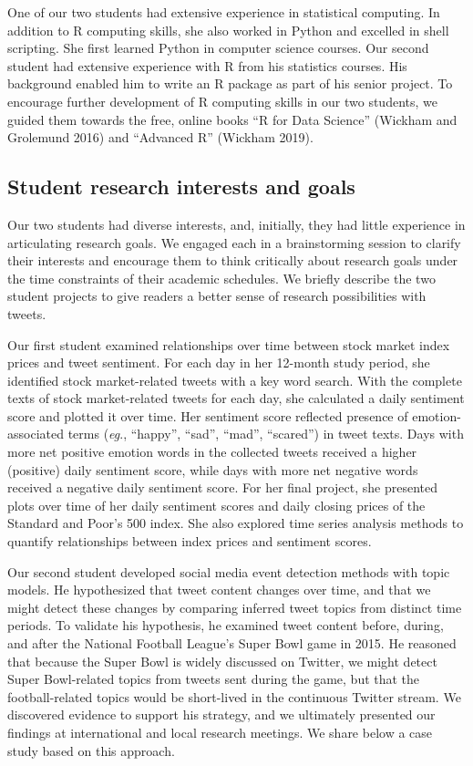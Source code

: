\documentclass[
]{article}
\begin{document}
One of our two students had extensive experience in statistical computing. In
addition to R computing skills, she also worked in Python and excelled in shell scripting.
She first learned Python in computer science courses. Our second student had
extensive experience with R from his statistics courses. His background
enabled him to write an R package as part of his senior project. To encourage
further development of R computing skills in our two students, we guided them
towards the free, online books ``R for Data Science'' (Wickham and Grolemund 2016) and ``Advanced R'' (Wickham 2019).

\hypertarget{student-research-interests-and-goals}{%
\subsection{Student research interests and goals}\label{student-research-interests-and-goals}}

Our two students had diverse interests, and, initially, they had little experience in
articulating research goals. We engaged each in a brainstorming session to
clarify their interests and encourage them to think critically about research goals under
the time constraints of their academic schedules.
We briefly describe the two student projects to give readers a better sense
of research possibilities with tweets.

Our first student examined relationships over time between
stock market index prices and tweet sentiment. For each day in her 12-month study period,
she identified stock market-related tweets with a key word search. With the complete
texts of stock market-related tweets for each day, she calculated a daily sentiment score and plotted it over time.
Her sentiment score reflected presence of emotion-associated terms
(\emph{eg}., ``happy'', ``sad'', ``mad'', ``scared'')
in tweet texts. Days with more net positive emotion words in the collected tweets received a higher
(positive) daily sentiment score, while days with more net negative words received a negative daily
sentiment score.
For her final project, she presented plots over time of her daily sentiment scores and daily closing
prices of the Standard and Poor's 500 index. She also explored time series analysis methods to quantify
relationships between index prices and sentiment scores.

Our second student developed social media event detection methods with topic
models. He hypothesized that tweet content changes over time, and that we
might detect these changes by comparing inferred tweet topics from distinct
time periods. To validate his hypothesis, he examined tweet content before, during, and after
the National Football League's Super Bowl game in 2015. He reasoned that
because the Super Bowl is widely discussed on Twitter, we might detect
Super Bowl-related topics from tweets sent during the game, but that the football-related
topics would be short-lived in the continuous Twitter stream. We discovered
evidence to support his strategy, and we ultimately presented our findings
at international and local research meetings. We share below a case study based
on this approach.
\end{document}
